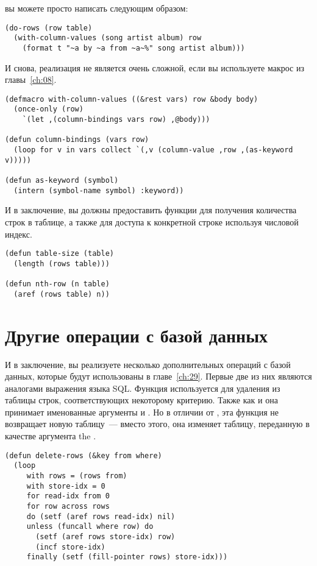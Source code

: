 вы можете просто написать следующим образом:

\begin{lstlisting}
(do-rows (row table)
  (with-column-values (song artist album) row
    (format t "~a by ~a from ~a~%" song artist album)))
\end{lstlisting}

И снова, реализация не является очень сложной, если вы используете макрос 
из главы~\ref{ch:08}.

\begin{lstlisting}
(defmacro with-column-values ((&rest vars) row &body body)
  (once-only (row)
    `(let ,(column-bindings vars row) ,@body)))

(defun column-bindings (vars row)
  (loop for v in vars collect `(,v (column-value ,row ,(as-keyword v)))))

(defun as-keyword (symbol)
  (intern (symbol-name symbol) :keyword))
\end{lstlisting}

И в заключение, вы должны предоставить функции для получения количества строк в таблице, а
также для доступа к конкретной строке используя числовой индекс.

\begin{lstlisting}
(defun table-size (table)
  (length (rows table)))

(defun nth-row (n table)
  (aref (rows table) n))
\end{lstlisting}

\section{Другие операции с базой данных}

И в заключение, вы реализуете несколько дополнительных операций с базой данных, которые
будут использованы в главе~\ref{ch:29}.  Первые две из них являются аналогами выражения
 языка SQL.  Функция  используется для удаления из таблицы
строк, соответствующих некоторому критерию.  Также как и  она принимает
именованные аргументы  и .  Но в отличии от , эта
функция не возвращает новую таблицу~--- вместо этого, она изменяет таблицу, переданную в
качестве аргумента the .

\begin{lstlisting}
(defun delete-rows (&key from where)
  (loop
     with rows = (rows from)
     with store-idx = 0
     for read-idx from 0
     for row across rows
     do (setf (aref rows read-idx) nil)
     unless (funcall where row) do
       (setf (aref rows store-idx) row)
       (incf store-idx)
     finally (setf (fill-pointer rows) store-idx)))
\end{lstlisting}

